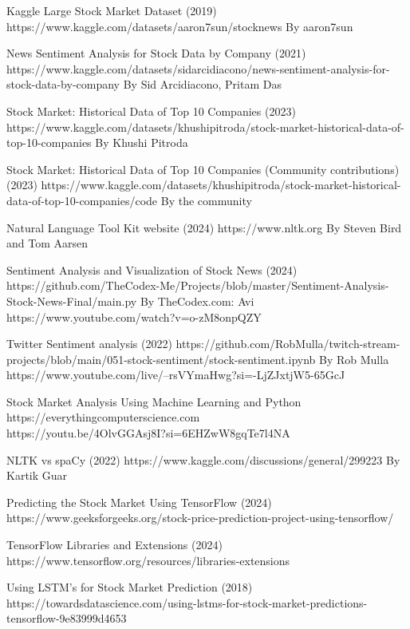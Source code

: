\documentclass[11pt, a4paper]{article}
\begin{document}
\newpage
\begin{thebibliography}{9}

Kaggle Large Stock Market Dataset (2019)
https://www.kaggle.com/datasets/aaron7sun/stocknews
By aaron7sun


News Sentiment Analysis for Stock Data by Company (2021)
https://www.kaggle.com/datasets/sidarcidiacono/news-sentiment-analysis-for-stock-data-by-company
By Sid Arcidiacono, Pritam Das

Stock Market: Historical Data of Top 10 Companies (2023)
https://www.kaggle.com/datasets/khushipitroda/stock-market-historical-data-of-top-10-companies
By Khushi Pitroda 

Stock Market: Historical Data of Top 10 Companies (Community contributions) (2023)
https://www.kaggle.com/datasets/khushipitroda/stock-market-historical-data-of-top-10-companies/code
By the community

Natural Language Tool Kit website (2024)
https://www.nltk.org
By Steven Bird and Tom Aarsen

Sentiment Analysis and Visualization of Stock News (2024)
https://github.com/TheCodex-Me/Projects/blob/master/Sentiment-Analysis-Stock-News-Final/main.py
By TheCodex.com: Avi
https://www.youtube.com/watch?v=o-zM8onpQZY

Twitter Sentiment analysis (2022)
https://github.com/RobMulla/twitch-stream-projects/blob/main/051-stock-sentiment/stock-sentiment.ipynb
By Rob Mulla
https://www.youtube.com/live/--rsVYmaHwg?si=-LjZJxtjW5-65GcJ

Stock Market Analysis Using Machine Learning and Python
\\https://everythingcomputerscience.com
\\https://youtu.be/4OlvGGAsj8I?si=6EHZwW8gqTe7l4NA


NLTK vs spaCy  (2022)
https://www.kaggle.com/discussions/general/299223
By Kartik Guar

Predicting the Stock Market Using TensorFlow (2024)
https://www.geeksforgeeks.org/stock-price-prediction-project-using-tensorflow/

TensorFlow Libraries and Extensions (2024)
https://www.tensorflow.org/resources/libraries-extensions

Using LSTM's for Stock Market Prediction (2018)
https://towardsdatascience.com/using-lstms-for-stock-market-predictions-tensorflow-9e83999d4653


\end{thebibliography}
\end{document}
